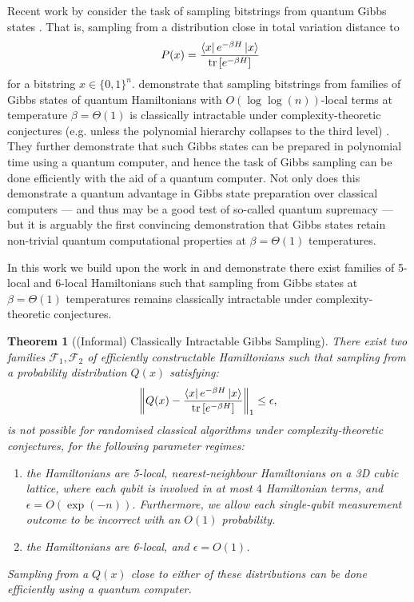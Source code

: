 \documentclass[a4paper,onecolumn,11pt,accepted=2017-05-09]{quantumarticle}
\newcommand{\norm}[1]{\left\lVert#1\right\rVert}
\DeclareMathOperator{\tr}{tr}
\newtheorem{theorem}{Theorem}
\begin{document}
    Recent work by \citeauthor{bergamaschi2024sample} consider the task of sampling bitstrings from quantum Gibbs states \cite{bergamaschi2024sample}. 
    That is, sampling from a distribution close in total variation distance to
    \begin{align*}
    \ P(x) = \frac{\bra{x}e^{-\beta H}\ket{x}}{\tr\left[e^{-\beta H}\right]}
    \end{align*}
    for a bitstring $x\in \{0,1\}^n$.
    \citeauthor{bergamaschi2024sample}  demonstrate that sampling bitstrings from families of Gibbs states of quantum Hamiltonians with $O(\log\log(n))$-local terms at temperature $\beta = \Theta(1)$ is classically intractable under complexity-theoretic conjectures (e.g. unless the polynomial hierarchy collapses to the third level) \cite{bergamaschi2024sample}.
    They further demonstrate that such Gibbs states can be prepared in polynomial time using a quantum computer, and hence the task of Gibbs sampling can be done efficiently with the aid of a quantum computer.
    Not only does this demonstrate a quantum advantage in Gibbs state preparation over classical computers --- and thus may be a good test of so-called quantum supremacy --- but it is arguably the first convincing demonstration that Gibbs states retain  non-trivial quantum computational properties at $\beta = \Theta(1)$ temperatures.


    In this work we build upon the work in \citeauthor{bergamaschi2024sample} and demonstrate there exist families of 5-local and 6-local Hamiltonians such that sampling from Gibbs states at $\beta = \Theta(1)$ temperatures remains classically intractable under complexity-theoretic conjectures.

    
    \begin{theorem}[(Informal) Classically Intractable Gibbs Sampling] \label{Theorem:Main}
    There exist two families $\mathcal{F}_1, \mathcal{F}_2$ of efficiently constructable Hamiltonians such that sampling from a probability distribution $Q(x)$ satisfying:
    \begin{align*}
        \norm{Q(x) - \frac{\bra{x}e^{-\beta H}\ket{x}}{\tr\left[e^{-\beta H}\right]} }_{1}\leq \epsilon,
    \end{align*}
    is not possible for randomised classical algorithms under complexity-theoretic conjectures, 
    for the following parameter regimes:
    \begin{enumerate}
        \item[$\mathcal{F}_1$:] the Hamiltonians are 5-local, nearest-neighbour Hamiltonians on a 3D cubic lattice, where each qubit is involved in at most $4$ Hamiltonian terms, and $\epsilon = O(\exp(-n))$.
        Furthermore, we allow each single-qubit measurement outcome to be incorrect with an $O(1)$ probability.
        
        \item[$\mathcal{F}_2$:] the Hamiltonians are 6-local, and  $\epsilon =O(1)$.
    \end{enumerate}
    Sampling from a $Q(x)$ close to either of these distributions can be done efficiently using a quantum computer.
    \end{theorem}
    
\end{document}
